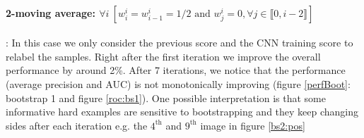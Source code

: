 \documentclass[a4paper]{article}
\begin{document}
        \paragraph{2-moving average: $\forall i\:[w_i^i=w_{i-1}^i=1/2\text{  and } w^i_j=0, \forall j\in\llbracket 0,i-2\rrbracket]$}: In this case we only consider the previous score and the CNN training score to relabel the samples. Right after the first iteration we improve the overall performance by around 2\%. After 7 iterations, we notice that the performance (average precision and AUC) is not monotonically improving (figure \ref{perfBoot}: bootstrap 1 and figure \ref{roc:bs1}). One possible interpretation is that some informative hard examples are sensitive to bootstrapping and they keep changing sides after each iteration e.g. the $4^{\text{th}}$ and $9^{\text{th}}$ image in figure \ref{bs2:pos}
\end{document}
